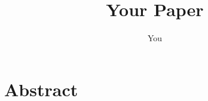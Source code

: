 \documentclass{report}
\title{Your Paper}
\author{You}
\begin{document}
\section{Abstract}
\end{document}
